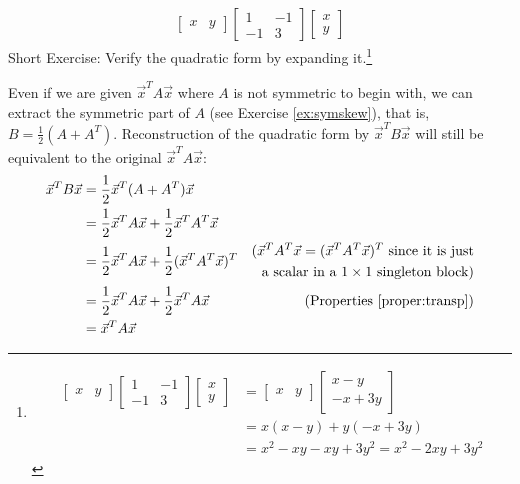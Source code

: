 \begin{align*}
\begin{bmatrix}
x & y
\end{bmatrix}
\begin{bmatrix}
1 & -1 \\
-1 & 3
\end{bmatrix}
\begin{bmatrix}
x \\
y
\end{bmatrix}
\end{align*}
Short Exercise: Verify the quadratic form by expanding it.\footnote{\begin{align*}
\begin{bmatrix}
x & y
\end{bmatrix}
\begin{bmatrix}
1 & -1 \\
-1 & 3
\end{bmatrix}
\begin{bmatrix}
x \\
y
\end{bmatrix} 
&= 
\begin{bmatrix}
x & y
\end{bmatrix}
\begin{bmatrix}
x - y \\
-x + 3y
\end{bmatrix} \\
&= x(x-y) + y(-x+3y) \\
&= x^2 - xy - xy + 3y^2 = x^2 - 2xy + 3y^2
\end{align*}} \par
Even if we are given $\vec{x}^TA\vec{x}$ where $A$ is not symmetric to begin with, we can extract the symmetric part of $A$ (see Exercise \ref{ex:symskew}), that is, $B = \frac{1}{2}(A + A^T)$. Reconstruction of the quadratic form by $\vec{x}^TB\vec{x}$ will still be equivalent to the original $\vec{x}^TA\vec{x}$:
\begin{align*}
\vec{x}^TB\vec{x} &= \frac{1}{2}\vec{x}^T(A + A^T)\vec{x} \\
&= \frac{1}{2}\vec{x}^TA\vec{x} + \frac{1}{2}\vec{x}^TA^T\vec{x} \\
&= \frac{1}{2}\vec{x}^TA\vec{x} + \frac{1}{2}(\vec{x}^TA^T\vec{x})^T & \begin{aligned}
\text{($\vec{x}^TA^T\vec{x} = (\vec{x}^TA^T\vec{x})^T$ since it is just} \\
\text{a scalar in a $1 \times 1$ singleton block)}  
\end{aligned} \\
&= \frac{1}{2}\vec{x}^TA\vec{x} + \frac{1}{2}\vec{x}^TA\vec{x} & \text{(Properties \ref{proper:transp})} \\
&= \vec{x}^TA\vec{x}
\end{align*}
